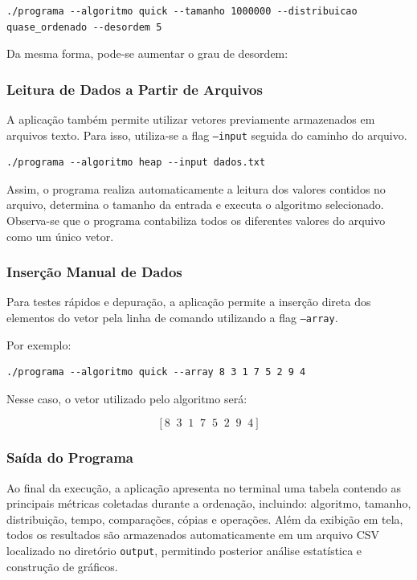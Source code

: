 \documentclass{article}
\begin{document}
\begin{verbatim}
./programa --algoritmo quick --tamanho 1000000 --distribuicao quase_ordenado --desordem 5
\end{verbatim}

Da mesma forma, pode-se aumentar o grau de desordem:

\subsubsection{Leitura de Dados a Partir de Arquivos}

A aplicação também permite utilizar vetores previamente armazenados em arquivos texto. 
Para isso, utiliza-se a flag \texttt{--input} seguida do caminho do arquivo.

\begin{verbatim}
./programa --algoritmo heap --input dados.txt
\end{verbatim}

Assim, o programa realiza automaticamente a leitura dos valores contidos no arquivo, determina o tamanho da entrada e executa o algoritmo selecionado.
Observa-se que o programa contabiliza todos os diferentes valores do arquivo como um único vetor. 

\subsubsection{Inserção Manual de Dados}

Para testes rápidos e depuração, a aplicação permite a inserção direta dos elementos do vetor pela linha de comando utilizando a flag \texttt{--array}.

Por exemplo:

\begin{verbatim}
./programa --algoritmo quick --array 8 3 1 7 5 2 9 4
\end{verbatim}

Nesse caso, o vetor utilizado pelo algoritmo será:

\[
[8 \;\; 3 \;\; 1 \;\; 7 \;\; 5 \;\; 2 \;\; 9 \;\; 4]
\]

\subsubsection{Saída do Programa}

Ao final da execução, a aplicação apresenta no terminal uma tabela contendo as principais métricas coletadas durante a ordenação, incluindo:
algoritmo, tamanho, distribuição, tempo, comparações, cópias e operações.
Além da exibição em tela, todos os resultados são armazenados automaticamente em um arquivo CSV localizado no diretório \texttt{output}, permitindo posterior análise estatística e construção de gráficos.
\end{document}
